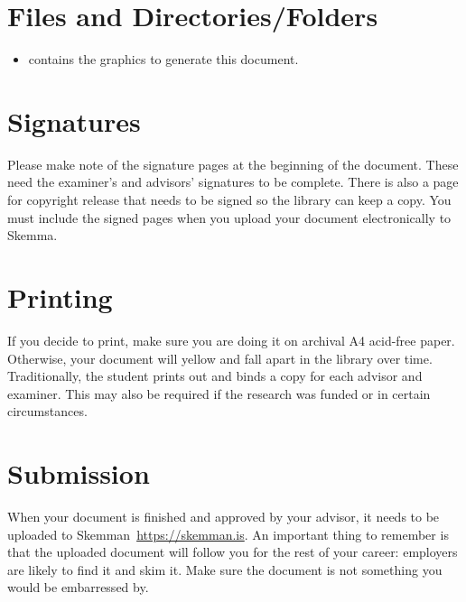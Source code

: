 \section{Files and Directories/Folders}
\begin{itemize}
\item {} contains the graphics to generate this document.
\end{itemize}

\section{Signatures}
Please make note of the signature pages at the beginning of the document.
These need the examiner's and advisors' signatures to be complete.
There is also a page for copyright release that needs to be signed so the library can keep a copy.
You must include the signed pages when you upload your document electronically to Skemma.

\section{Printing}
If you decide to print, make sure you are doing it on archival A4 acid-free paper.
Otherwise, your document will yellow and fall apart in the library over time.
Traditionally, the student prints out and binds a copy for each advisor and examiner.
This may also be required if the research was funded or in certain circumstances.

\section{Submission}
When your document is finished and approved by your advisor, it needs to be uploaded to Skemman~\url{https://skemman.is}.
An important thing to remember is that the uploaded document will follow you for the rest of your career:
employers are likely to find it and skim it.
Make sure the document is not something you would be embarressed by.

